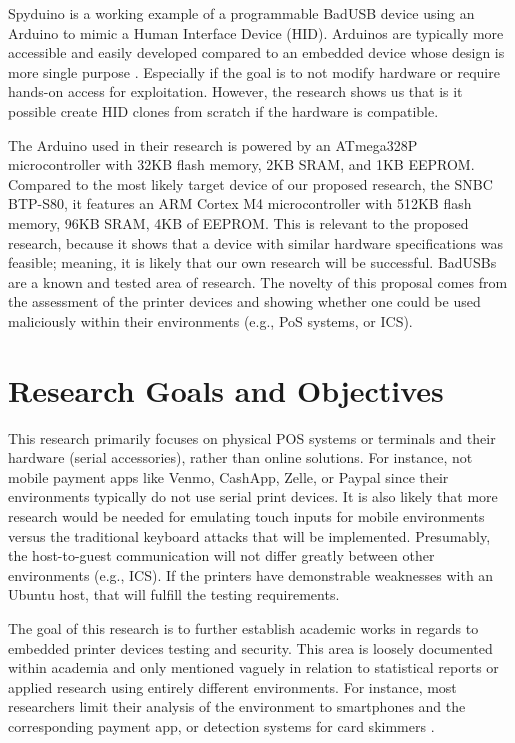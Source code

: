 Spyduino is \autocite{karystinosSpyduinoArduinoHID2019} a working example of a programmable BadUSB device using an Arduino to mimic a Human Interface Device (HID). Arduinos are typically more accessible and easily developed compared to an embedded device whose design is more single purpose \autocite{ComparativeStudyArduino,griffithsECIAIR2019European2019}. Especially if the goal is to not modify hardware or require hands-on access for exploitation. However, the research shows us that is it possible create HID clones from scratch if the hardware is compatible.

The Arduino used in their research is powered by an ATmega328P microcontroller with 32KB flash memory, 2KB SRAM, and 1KB EEPROM. Compared to the most likely target device of our proposed research, the SNBC BTP-S80, it features an ARM Cortex M4 microcontroller with 512KB flash memory, 96KB SRAM, 4KB of EEPROM. This is relevant to the proposed research, because it shows that a device with similar hardware specifications was feasible; meaning, it is likely that our own research will be successful. BadUSBs are a known and tested area of research. The novelty of this proposal comes from the assessment of the printer devices and showing whether one could be used maliciously within their environments (e.g., PoS systems, or ICS).

\section{Research Goals and Objectives}  \label{researchgoalsobjectives}

This research primarily focuses on physical POS systems or terminals and their hardware (serial accessories), rather than online solutions. For instance, not mobile payment apps like Venmo, CashApp, Zelle, or Paypal \autocite{wangMobilePaymentSecurity2016} since their environments typically do not use serial print devices. It is also likely that more research would be needed for emulating touch inputs for mobile environments versus the traditional keyboard attacks that will be implemented. Presumably, the host-to-guest communication will not differ greatly
between other environments (e.g., ICS). If the printers have demonstrable weaknesses with an Ubuntu host, that will fulfill the testing requirements.

The goal of this research is to further establish academic works in regards to embedded printer devices testing and security. This area is loosely documented within academia and only mentioned vaguely in relation to statistical reports or applied research using entirely different environments. For instance, most researchers limit their analysis of the environment to smartphones and the corresponding payment app, or detection systems for card skimmers \autocite{scaifeFearReaperCharacterization2018}.

